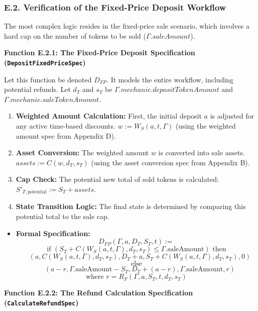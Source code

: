 \documentclass[
  english,
  onecolumn]{article}
\providecommand{\tightlist}{%
  \setlength{\itemsep}{0pt}\setlength{\parskip}{0pt}}
\begin{document}
\subsubsection{E.2. Verification of the Fixed-Price Deposit
Workflow}\label{e.2.-verification-of-the-fixed-price-deposit-workflow}

The most complex logic resides in the fixed-price sale scenario, which
involves a hard cap on the number of tokens to be sold
(\(\Gamma.saleAmount\)).

\textbf{Function E.2.1: The Fixed-Price Deposit Specification
(\texttt{DepositFixedPriceSpec})}

Let this function be denoted \(D_{FP}\). It models the entire workflow,
including potential refunds. Let \(d_T\) and \(s_T\) be
\(\Gamma.mechanic.depositTokenAmount\) and
\(\Gamma.mechanic.saleTokenAmount\).

\begin{enumerate}
\def\labelenumi{\arabic{enumi}.}
\tightlist
\item
  \textbf{Weighted Amount Calculation:} First, the initial deposit \(a\)
  is adjusted for any active time-based discounts.
  \(w := W_S(a, t, \Gamma)\) (using the weighted amount spec from
  Appendix D).
\item
  \textbf{Asset Conversion:} The weighted amount \(w\) is converted into
  sale assets. \(assets := C(w, d_T, s_T)\) (using the asset conversion
  spec from Appendix B).
\item
  \textbf{Cap Check:} The potential new total of sold tokens is
  calculated: \(S'_{T, \text{potential}} := S_T + assets\).
\item
  \textbf{State Transition Logic:} The final state is determined by
  comparing this potential total to the sale cap.
\end{enumerate}

\begin{itemize}
\tightlist
\item
  \textbf{Formal Specification:} \[
  D_{FP}(\Gamma, a, D_T, S_T, t) :=
  \] \[
  \text{if } (S_T + C(W_S(a, t, \Gamma), d_T, s_T) \le \Gamma.\text{saleAmount}) \text{ then}
  \] \[
  \quad (a, C(W_S(a, t, \Gamma), d_T, s_T), D_T + a, S_T + C(W_S(a, t, \Gamma), d_T, s_T), 0)
  \] \[
  \text{else}
  \] \[
  \quad (a - r, \Gamma.\text{saleAmount} - S_T, D_T + (a-r), \Gamma.\text{saleAmount}, r)
  \] \[
  \text{where } r = R_F(\Gamma, a, S_T, t, d_T, s_T)
  \]
\end{itemize}

\textbf{Function E.2.2: The Refund Calculation Specification
(\texttt{CalculateRefundSpec})}
\end{document}
